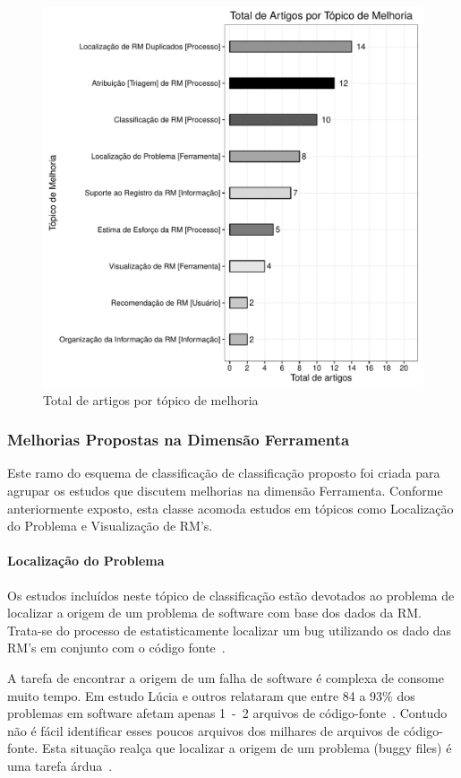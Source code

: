 \begin{figure}[htpb]
	\centering
	\includegraphics[width=0.8\linewidth]{./chapter-mapeamento-sistematico/img/grafico_topico_por_artigo.pdf}
	\caption{Total de artigos por tópico de melhoria}
\label{fig:grafico_topico_por_artigo}
\end{figure}

\subsubsection{Melhorias Propostas na Dimensão Ferramenta}
\label{ssub:melhorias_dim_ferramenta}

Este ramo do esquema de classificação de classificação proposto foi criada para
agrupar os estudos que discutem melhorias na dimensão Ferramenta. Conforme
anteriormente exposto, esta classe acomoda estudos em tópicos como Localização
	do Problema e Visualização de RM's.
\paragraph{Localização do Problema}
Os estudos incluídos neste tópico de classificação estão devotados ao problema
de localizar a origem de um problema de software com base dos dados da RM\@.
Trata-se do processo de estatisticamente localizar um bug utilizando os dado das
RM's em conjunto com o código fonte~\cite{Hovemeyer:2004:FBE:1052883.1052895}.

A tarefa de encontrar a origem de um falha de software é complexa de consome
muito tempo. Em estudo Lúcia e outros relataram que entre 84 a 93\% dos
problemas em software afetam apenas 1~-~2 arquivos de
código-fonte~\cite{thung2012faults}. Contudo não é fácil identificar esses
poucos arquivos dos milhares de arquivos de código-fonte. Esta situação
realça que localizar a origem de um problema (buggy files) é uma tarefa
árdua~\cite{Thung:2014:BIT:2635868.2661678}.

